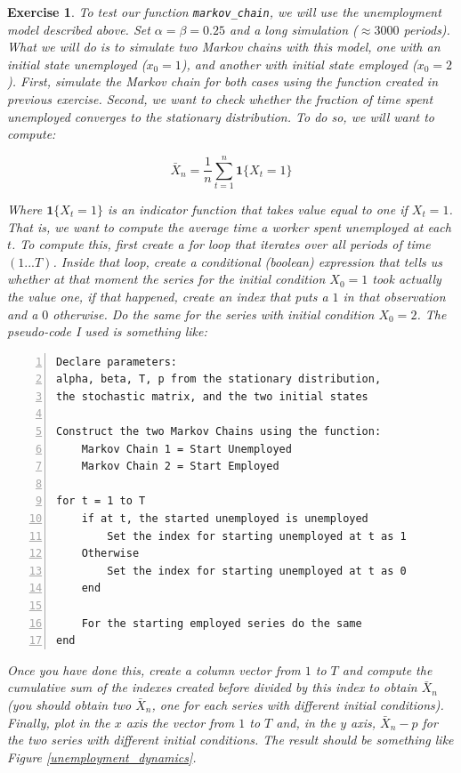 \documentclass[a4paper,12pt]{article}
\newtheorem{exercise}{Exercise}
\begin{document}
\begin{exercise}
To test our function \texttt{markov_chain}, we will use the unemployment model described above. Set $\alpha = \beta = 0.25$ and a long simulation ($\approx 3000$ periods). What we will do is to simulate two Markov chains with this model, one with an initial state unemployed ($x_0 = 1$), and another with initial state employed ($x_0 = 2$). First, simulate the Markov chain for both cases using the function created in previous exercise. Second, we want to check whether the fraction of time spent unemployed converges to the stationary distribution. To do so, we will want to compute:

\[
\bar{X}_n = \frac{1}{n} \sum^n_{t=1} \mathbf{1}\{X_t = 1\}
\]
	
Where $\mathbf{1}\{X_t = 1\}$ is an indicator function that takes value equal to one if $X_t = 1$. That is, we want to compute the average time a worker spent unemployed at each $t$. To compute this, first create a for loop that iterates over all periods of time $(1...T)$. Inside that loop, create a conditional (boolean) expression that tells us whether at that moment the series for the initial condition $X_0=1$ took actually the value one, if that happened, create an index that puts a $1$ in that observation and a $0$ otherwise. Do the same for the series with initial condition $X_0 = 2$. The pseudo-code I used is something like:

\begin{Verbatim}[numbers = left]
Declare parameters:
alpha, beta, T, p from the stationary distribution, 
the stochastic matrix, and the two initial states

Construct the two Markov Chains using the function:
	Markov Chain 1 = Start Unemployed
	Markov Chain 2 = Start Employed

for t = 1 to T
	if at t, the started unemployed is unemployed
		Set the index for starting unemployed at t as 1
	Otherwise
		Set the index for starting unemployed at t as 0
	end
	
	For the starting employed series do the same
end
\end{Verbatim}

Once you have done this, create a column vector from $1$ to $T$ and compute the cumulative sum of the indexes created before divided by this index to obtain $\bar{X}_n$ (you should obtain two $\bar{X}_n$, one for each series with different initial conditions). Finally, plot in the $x$ axis the vector from $1$ to $T$ and, in the $y$ axis, $\bar{X}_n - p$ for the two series with different initial conditions. The result should be something like Figure \ref{unemployment_dynamics}.
	

\end{exercise}
\end{document}
